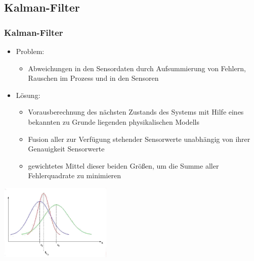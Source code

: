 \documentclass[10pt,a4paper,oneside]{beamer}
\begin{document}
\begin{frame}
  \section{Kalman-Filter}
  \frametitle{Kalman-Filter}
  \begin{itemize}
  	\item Problem:
  		\begin{itemize}
  			\item Abweichungen in den Sensordaten durch Aufsummierung von Fehlern, Rauschen im Prozess und in den Sensoren
  		\end{itemize}
  	\item Lösung:
  		\begin{itemize}
  			\item Vorausberechnung des nächsten Zustands des Systems mit Hilfe eines bekannten zu Grunde liegenden physikalischen Modells
  			\item Fusion aller zur Verfügung stehender Sensorwerte unabhängig von ihrer Genauigkeit Sensorwerte
  			\item gewichtetes Mittel dieser beiden Größen, um die Summe aller Fehlerquadrate zu minimieren
  		\end{itemize}
  \end{itemize}
  \includegraphics[width=0.4\textwidth]{images/Grundkurven.jpg}
\end{frame}
\end{document}
